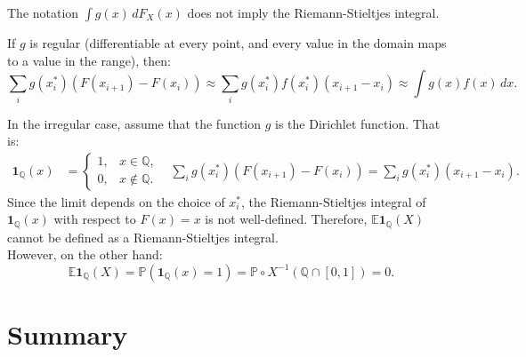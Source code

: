 \documentclass{huhtakm-template-book-v2}
\newcommand{\prob}{\mathbb{P}}
\newcommand{\expect}{\mathbb{E}}
\begin{document}
    \begin{rem}
        The notation $\int g(x)\,dF_{X}(x)$ does not imply the Riemann-Stieltjes integral.
    \end{rem}
    \begin{eg}
        If $g$ is regular (differentiable at every point, and every value in the domain maps to a value in the range), then:
        \begin{equation*}
            \sum_{i}g(x_{i}^{*})(F(x_{i+1}) - F(x_{i})) \approx \sum_{i}g(x_{i}^{*})f(x_{i}^{*})(x_{i+1} - x_{i}) \approx \int g(x)f(x)\,dx.
        \end{equation*}
    \end{eg}
    \begin{eg}
        In the irregular case, assume that the function $g$ is the Dirichlet function. That is:
        \begin{align*}
            \mathbf{1}_{\mathbb{Q}}(x) &= \begin{cases}
                1, & x \in \mathbb{Q},\\
                0, & x \not \in \mathbb{Q}.
            \end{cases} & \sum_{i}g(x_{i}^{*})(F(x_{i+1}) - F(x_{i})) = \sum_{i}g(x_{i}^{*})(x_{i+1} - x_{i}).
        \end{align*}
        Since the limit depends on the choice of $x_{i}^{*}$, the Riemann-Stieltjes integral of $\mathbf{1}_{\mathbb{Q}}(x)$ with respect to $F(x) = x$ is not well-defined. Therefore, $\expect{\mathbf{1}_{\mathbb{Q}}(X)}$ cannot be defined as a Riemann-Stieltjes integral.\\
        However, on the other hand:
        \begin{equation*}
            \expect{\mathbf{1}_{\mathbb{Q}}(X)} = \prob(\mathbf{1}_{\mathbb{Q}}(x) = 1) = \prob \circ X^{-1}(\mathbb{Q} \cap [0,1]) = 0.
        \end{equation*}
    \end{eg}


\chapter*{Summary}
\end{document}
